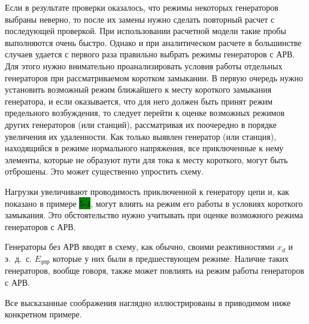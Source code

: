 Если в результате проверки оказалось, что режимы некоторых генераторов выбраны неверно, то после их замены нужно сделать повторный расчет с последующей проверкой. При использовании расчетной модели такие пробы выполняются очень быстро. Однако и при аналитическом расчете в большинстве случаев удается с первого раза правильно выбрать режимы генераторов с АРВ. Для этого нужно внимательно проанализировать условия работы отдельных генераторов при рассматриваемом коротком замыкании. В первую очередь нужно установить возможный режим ближайшего к месту короткого замыкания генератора, и если оказывается, что для него должен быть принят режим предельного возбуждения, то следует перейти к оценке возможных режимов других генераторов (или станций), рассматривая их поочередно в порядке увеличения их удаленности. Как только выявлен генератор (или станция), находящийся в режиме нормального напряжения, все приключенные к нему элементы, которые не образуют пути для тока к месту короткого, могут быть отброшены. Это может существенно упростить схему.

Нагрузки увеличивают проводимость приключенной к генератору цепи и, как показано в примере \colorbox{green}{5-4}, могут влиять на режим его работы в условиях короткого замыкания. Это обстоятельство нужно учитывать при оценке возможного режима генераторов с АРВ.

Генераторы без АРВ вводят в схему, как обычно, своими реактивностями $ x_d $ и э.~д.~с. $ E_{q\text{пр}} $ которые у них были в предшествующем режиме. Наличие таких генераторов, вообще говоря, также может повлиять на режим работы генераторов с АРВ.

Все высказанные соображения наглядно иллюстрированы в приводимом ниже конкретном примере.